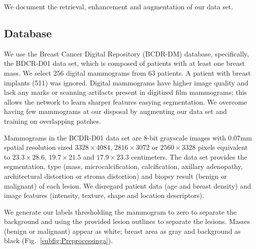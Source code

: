 We document the retrieval, enhancement and augmentation of our data set.

\subsection{Database}
We use the Breast Cancer Digital Repository (BCDR-DM) database, specifically, the BDCR-D01 data set, which is composed of patients with at least one breast mass.
We select 256 digital mammograms from 63 patients.
A patient with breast implants (511) was ignored.
Digital mammograms have higher image quality and lack any marks or scanning artifacts present in digitized film mammograms; this allows the network to learn sharper features easying segmentation.
We overcome having few mammograms at our disposal by augmenting our data set and training on overlapping patches.

Mammograms in the BCDR-D01 data set are 8-bit grayscale images with 0.07mm spatial resolution sized $3328\times 4084$, $2816\times 3072$ or $2560 \times 3328$ pixels equivalent to $23.3 \times 28.6$, $19.7 \times 21.5$ and $17.9 \times 23.3$ centimeters.
The data set provides the segmentation, type (mass, microcalcification, calcification, axillary adenopathy, architectural distortion or stroma distortion) and biopsy result (benign or malignant) of each lesion.
We disregard patient data (age and breast density) and image features (intensity, texture, shape and location descriptors).

We generate our labels thresholding the mammogram to zero to separate the background and using the provided lesion outlines to separate the lesions.
Masses (benign or malignant) appear as white; breast area as gray and background as black (Fig.~\ref{subfig:Preprocessinga}).

